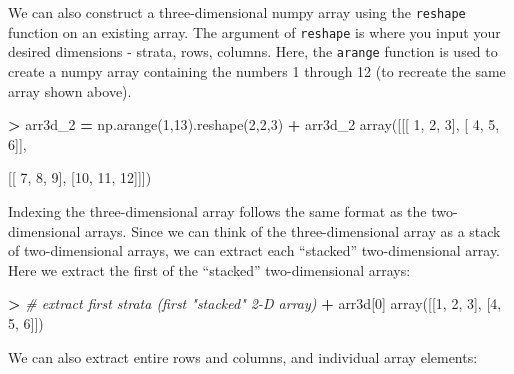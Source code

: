 \documentclass[
]{book}
\newenvironment{Shaded}{\begin{snugshade}}{\end{snugshade}}
\newcommand{\CommentTok}[1]{\textcolor[rgb]{0.56,0.35,0.01}{\textit{#1}}}
\newcommand{\DecValTok}[1]{\textcolor[rgb]{0.00,0.00,0.81}{#1}}
\newcommand{\NormalTok}[1]{#1}
\newcommand{\OperatorTok}[1]{\textcolor[rgb]{0.81,0.36,0.00}{\textbf{#1}}}
\begin{document}
We can also construct a three-dimensional numpy array using the \texttt{reshape} function on an existing array. The argument of \texttt{reshape} is where you input your desired dimensions - strata, rows, columns. Here, the \texttt{arange} function is used to create a numpy array containing the numbers 1 through 12 (to recreate the same array shown above).

\begin{Shaded}
\begin{Highlighting}[]
\OperatorTok{\textgreater{}}\NormalTok{ arr3d\_2 }\OperatorTok{=}\NormalTok{ np.arange(}\DecValTok{1}\NormalTok{,}\DecValTok{13}\NormalTok{).reshape(}\DecValTok{2}\NormalTok{,}\DecValTok{2}\NormalTok{,}\DecValTok{3}\NormalTok{)}
\OperatorTok{+}\NormalTok{ arr3d\_2}
\NormalTok{array([[[ }\DecValTok{1}\NormalTok{,  }\DecValTok{2}\NormalTok{,  }\DecValTok{3}\NormalTok{],}
\NormalTok{        [ }\DecValTok{4}\NormalTok{,  }\DecValTok{5}\NormalTok{,  }\DecValTok{6}\NormalTok{]],}

\NormalTok{       [[ }\DecValTok{7}\NormalTok{,  }\DecValTok{8}\NormalTok{,  }\DecValTok{9}\NormalTok{],}
\NormalTok{        [}\DecValTok{10}\NormalTok{, }\DecValTok{11}\NormalTok{, }\DecValTok{12}\NormalTok{]]])}
\end{Highlighting}
\end{Shaded}

Indexing the three-dimensional array follows the same format as the two-dimensional arrays. Since we can think of the three-dimensional array as a stack of two-dimensional arrays, we can extract each ``stacked'' two-dimensional array. Here we extract the first of the ``stacked'' two-dimensional arrays:

\begin{Shaded}
\begin{Highlighting}[]
\OperatorTok{\textgreater{}} \CommentTok{\# extract first strata (first "stacked" 2{-}D array)}
\OperatorTok{+}\NormalTok{ arr3d[}\DecValTok{0}\NormalTok{]}
\NormalTok{array([[}\DecValTok{1}\NormalTok{, }\DecValTok{2}\NormalTok{, }\DecValTok{3}\NormalTok{],}
\NormalTok{       [}\DecValTok{4}\NormalTok{, }\DecValTok{5}\NormalTok{, }\DecValTok{6}\NormalTok{]])}
\end{Highlighting}
\end{Shaded}

We can also extract entire rows and columns, and individual array elements:
\end{document}
